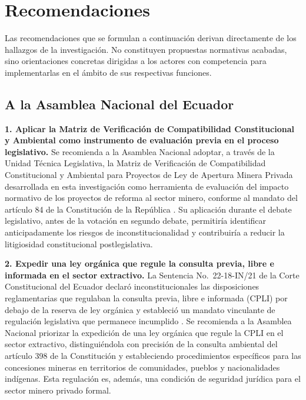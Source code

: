 
\chapter*{Recomendaciones}

Las recomendaciones que se formulan a continuación derivan directamente de los hallazgos de la investigación. No constituyen propuestas normativas acabadas, sino orientaciones concretas dirigidas a los actores con competencia para implementarlas en el ámbito de sus respectivas funciones.

\section*{A la Asamblea Nacional del Ecuador}

\textbf{1. Aplicar la Matriz de Verificación de Compatibilidad Constitucional y Ambiental como instrumento de evaluación previa en el proceso legislativo.} Se recomienda a la Asamblea Nacional adoptar, a través de la Unidad Técnica Legislativa, la Matriz de Verificación de Compatibilidad Constitucional y Ambiental para Proyectos de Ley de Apertura Minera Privada desarrollada en esta investigación como herramienta de evaluación del impacto normativo de los proyectos de reforma al sector minero, conforme al mandato del artículo 84 de la Constitución de la República \parencite{cre_2008}. Su aplicación durante el debate legislativo, antes de la votación en segundo debate, permitiría identificar anticipadamente los riesgos de inconstitucionalidad y contribuiría a reducir la litigiosidad constitucional postlegislativa.

\textbf{2. Expedir una ley orgánica que regule la consulta previa, libre e informada en el sector extractivo.} La Sentencia No.\ 22-18-IN/21 de la Corte Constitucional del Ecuador declaró inconstitucionales las disposiciones reglamentarias que regulaban la consulta previa, libre e informada (CPLI) por debajo de la reserva de ley orgánica y estableció un mandato vinculante de regulación legislativa que permanece incumplido \parencite{cce_22_18_in_21}. Se recomienda a la Asamblea Nacional priorizar la expedición de una ley orgánica que regule la CPLI en el sector extractivo, distinguiéndola con precisión de la consulta ambiental del artículo 398 de la Constitución y estableciendo procedimientos específicos para las concesiones mineras en territorios de comunidades, pueblos y nacionalidades indígenas. Esta regulación es, además, una condición de seguridad jurídica para el sector minero privado formal.

